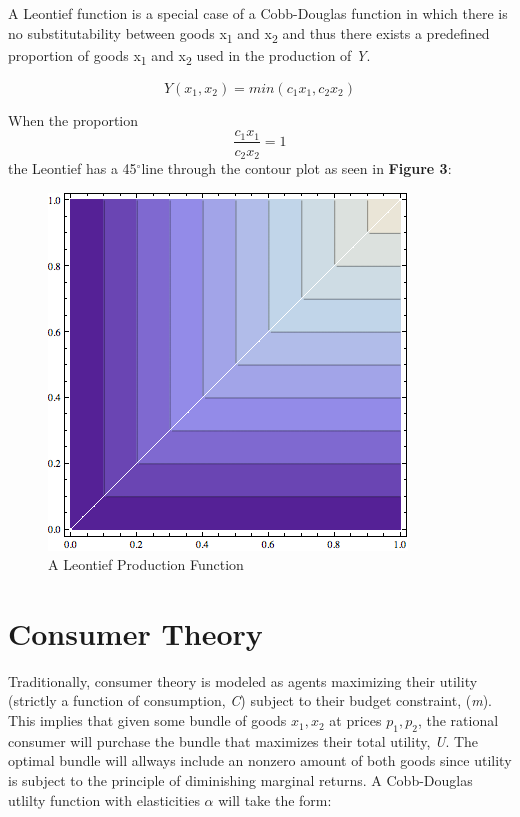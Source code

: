 \documentclass{article}
\newcommand{\degree}{\ensuremath{^\circ}}
\begin{document}
\*

A Leontief function is a special case of a Cobb-Douglas function in which there is no substitutability between goods x\textsubscript{1} and x\textsubscript{2} and thus there exists a predefined proportion of goods x\textsubscript{1} and x\textsubscript{2} used in the production of \emph{Y}. 

\begin{equation}
	Y(x_{1}, x_2) = min(c_{1}x_{1}, c_{2}x_{2})
\end{equation}

When the proportion 
$$\frac{c_{1}x_{1}}{c_{2}x_{2}} = 1$$
the Leontief has a 45\degree line through the contour plot as seen in {\bf Figure 3}:

\begin{figure}[!ht]
	\begin{center}
	\includegraphics[scale=0.5]{Figures/Leontief.png}
	\caption{A Leontief Production Function}
	\end{center}
\end{figure}


\section{Consumer Theory}
Traditionally, consumer theory is modeled as agents maximizing their utility (strictly a function of consumption, \emph{C}) subject to their budget constraint, (\emph{m}). This implies that given some bundle of goods $x_{1}, x_{2}$ at prices $p_{1}, p_{2}$, the rational consumer will purchase the bundle that maximizes their total utility, \emph{U}. The optimal bundle will allways include an nonzero amount of both goods since utility is subject to the principle of diminishing marginal returns. \*
A Cobb-Douglas utlilty function with elasticities $\alpha$ will take the form:
\end{document}
